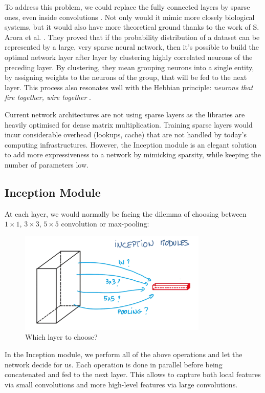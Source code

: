 To address this problem, we could replace the fully connected layers by sparse ones, even inside convolutions \cite{googlenet}. Not only would it mimic more closely biological systems, but it would also have more theoretical ground thanks to the work of S. Arora et al. \cite{arora}. They proved that if the probability distribution of a dataset can be represented by a large, very sparse neural network, then it's possible to build the optimal network layer after layer by clustering highly correlated neurons of the preceding layer. By clustering, they mean grouping neurons into a single entity, by assigning weights to the neurons of the group, that will be fed to the next layer.
This process also resonates well with the Hebbian principle: {\em neurons that fire together, wire together} \cite{hebbian}.

Current network architectures are not using sparse layers as the libraries are heavily optimised for dense matrix multiplication. Training sparse layers would incur considerable overhead (lookups, cache) that are not handled by today's computing infrastructures. However, the Inception module is an elegant solution to add more expressiveness to a network by mimicking sparsity, while keeping the number of parameters low. 

\subsection{Inception Module}
At each layer, we would normally be facing the dilemma of choosing between $1\times 1$, $3\times 3$, $5\times5$ convolution or max-pooling:

\begin{figure}[H]
    \centering
    \includegraphics[width=0.8\textwidth]{Images/inceptionmodule.png}
    \caption{Which layer to choose? \cite{inceptionmodule}}
\end{figure}

In the Inception module, we perform all of the above operations and let the network decide for us. Each operation is done in parallel before being concatenated and fed to the next layer. This allows to capture both local features via small convolutions and more high-level features via large convolutions. 

